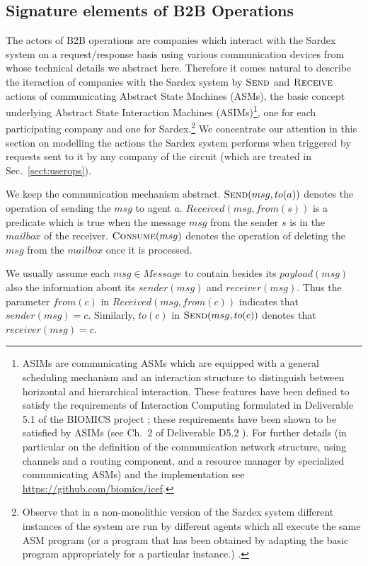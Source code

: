\subsection{Signature elements of B2B Operations}
\label{signaturepaymtop}
The actors of B2B operations are companies which interact with the Sardex system on a request/response basis using various 
communication devices from whose technical details we abstract here. Therefore it comes natural to describe the iteraction of companies with the Sardex system by $\hbox{\sc Send}$ and $\hbox{\sc Receive}$ actions of communicating Abstract State Machines (ASMs), the basic concept underlying Abstract State Interaction Machines (ASIMs)\footnote{ASIMs are communicating ASMs which are equipped with a general scheduling mechanism and an interaction structure to distinguish
between horizontal and hierarchical interaction. These features have
been defined to satisfy the requirements of Interaction Computing
formulated in Deliverable 5.1 of the BIOMICS project  \cite{BIOMICSD51}; these requirements have been shown to be satisfied by ASIMs (see Ch.\ 2 of
Deliverable D5.2 \cite{BIOMICSD52}). For further details (in particular on the
definition of the communication network structure, using channels and
a routing component, and a resource manager by specialized
communicating ASMs) and the implementation see
\url{https://github.com/biomics/icef}.}, one for each participating company and one for Sardex.\footnote{Observe that in a non-monolithic version of the Sardex system different instances of the system are run by different agents which all execute the same ASM program (or a program that has been obtained by adapting the basic program appropriately for a particular instance.) .} We concentrate our attention in this section on modelling the actions the Sardex system performs when triggered by requests sent to it by any company of the circuit (which are treated in Sec.~\ref{sect:userops}).

We keep the communication mechanism abstract. $\hbox{\sc Send}(msg,to(a))$ denotes the operation of sending the $msg$ to agent $a$. 
$Received(msg,from(s))$ is a predicate which is true when the message $msg$ from the sender $s$ is in the $mailbox$ of the receiver. $\hbox{\sc Consume}(msg)$ denotes the operation of deleting the $msg$ from the $mailbox$ once it is processed. 

We usually assume  each $msg \in Message$ to contain besides its $payload(msg)$ also the information about its $sender(msg)$ and $receiver(msg)$. Thus the parameter $from(c)$ in $Received(msg, from(c))$ indicates that $sender(msg)=c$. Similarly, $to(c)$ in $\hbox{\sc Send}(msg, to(c))$ denotes that $receiver(msg) = c$.

